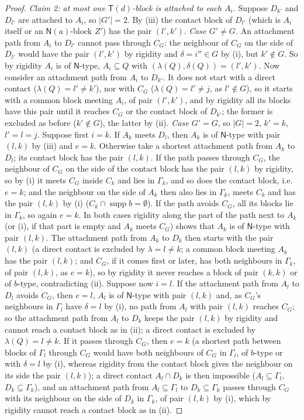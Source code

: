 \documentclass[11pt]{amsart}
\theoremstyle{definition}
\newcommand{\supp}{\operatorname{supp}}
\newcommand{\T}{\mathsf{T}}
\newcommand{\N}{\mathsf{N}}
\begin{document}
\begin{proof}
\emph{Claim 2: at most one $\T(d)$-block is attached to each $A_i$.} Suppose $D_{k'}$ and $D_{l'}$ are attached to $A_i$, so $|G'|=2$. By (iii) the contact block of $D_{l'}$ (which is $A_i$ itself or an $\N(a)$-block $Z'$) has the pair $(l',k')$. \emph{Case $G'\ne G$.} An attachment path from $A_i$ to $D_{l'}$ cannot pass through $C_G$: the neighbour of $C_G$ on the side of $D_{l'}$ would have the pair $(l',k')$ by rigidity and $\delta=i''\in G$ by (i), but $k'\notin G$. So by rigidity $A_i$ is of $\N$-type, $A_i\subseteq Q$ with $(\lambda(Q),\delta(Q))=(l',k')$. Now consider an attachment path from $A_i$ to $D_{k'}$. It does not start with a direct contact ($\lambda(Q)=l'\ne k'$), nor with $C_G$ ($\lambda(Q)=l'\ne j$, as $l'\notin G$), so it starts with a common block meeting $A_i$, of pair $(l',k')$, and by rigidity all its blocks have this pair until it reaches $C_G$ or the contact block of $D_{k'}$; the former is excluded as before ($k'\notin G$), the latter by (ii). \emph{Case $G'=G$}, so $|G|=2$, $k'=k$, $l'=l=j$. Suppose first $i=k$. If $A_k$ meets $D_l$, then $A_k$ is of $\N$-type with pair $(l,k)$ by (iii) and $e=k$. Otherwise take a shortest attachment path from $A_k$ to $D_l$; its contact block has the pair $(l,k)$. If the path passes through $C_G$, the neighbour of $C_G$ on the side of the contact block has the pair $(l,k)$ by rigidity, so by (i) it meets $C_G$ inside $C_k$ and lies in $\Gamma_k$, and so does the contact block, i.e.\ $e=k$; and the neighbour on the side of $A_k$ then also lies in $\Gamma_k$, meets $C_k$ and has the pair $(l,k)$ by (i) ($C_k\cap\supp b=\emptyset$). If the path avoids $C_G$, all its blocks lie in $\Gamma_k$, so again $e=k$. In both cases rigidity along the part of the path next to $A_k$ (or (i), if that part is empty and $A_k$ meets $C_G$) shows that $A_k$ is of $\N$-type with pair $(l,k)$. The attachment path from $A_k$ to $D_k$ then starts with the pair $(l,k)$ (a direct contact is excluded by $\lambda=l\ne k$; a common block meeting $A_k$ has the pair $(l,k)$; and $C_G$, if it comes first or later, has both neighbours in $\Gamma_k$, of pair $(l,k)$, as $e=k$), so by rigidity it never reaches a block of pair $(k,k)$ or of $b$-type, contradicting (ii). Suppose now $i=l$. If the attachment path from $A_l$ to $D_l$ avoids $C_G$, then $e=l$, $A_l$ is of $\N$-type with pair $(l,k)$ and, as $C_G$'s neighbours in $\Gamma_l$ have $\delta=l$ by (i), no path from $A_l$ with pair $(l,k)$ reaches $C_G$; so the attachment path from $A_l$ to $D_k$ keeps the pair $(l,k)$ by rigidity and cannot reach a contact block as in (ii); a direct contact is excluded by $\lambda(Q)=l\ne k$. If it passes through $C_G$, then $e=k$ (a shortest path between blocks of $\Gamma_l$ through $C_G$ would have both neighbours of $C_G$ in $\Gamma_l$, of $b$-type or with $\delta=l$ by (i), whereas rigidity from the contact block gives the neighbour on its side the pair $(l,k)$); a direct contact $A_l\cap D_k$ is then impossible ($A_l\subseteq\Gamma_l$, $D_k\subseteq\Gamma_k$), and an attachment path from $A_l\subseteq\Gamma_l$ to $D_k\subseteq\Gamma_k$ passes through $C_G$ with its neighbour on the side of $D_k$ in $\Gamma_k$, of pair $(l,k)$ by (i), which by rigidity cannot reach a contact block as in (ii).


\end{proof}
\end{document}
